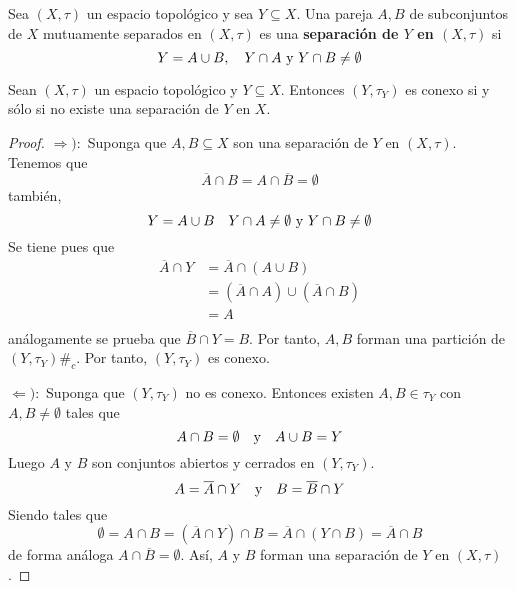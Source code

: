 \documentclass[12pt]{report}
\theoremstyle{largebreak}
\newcommand\contradiction{\ensuremath{\#_c}}
\newcommand{\Cls}[1]{\ensuremath{\overline{#1}}}
\begin{document}
    \begin{mydef}
        Sea $(X,\tau)$ un espacio topológico y sea $Y\subseteq X$. Una pareja $A,B$ de subconjuntos de $X$ mutuamente separados en $(X,\tau)$ es una \textbf{separación de $Y$ en $(X,\tau)$} si
        \begin{equation*}
            Y=A\cup B,\quad Y\cap A\textup{ y }Y\cap B \neq\emptyset
        \end{equation*}
    \end{mydef}

    \begin{propo}
        Sean $(X,\tau)$ un espacio topológico y $Y\subseteq X$. Entonces $(Y,\tau_Y)$ es conexo si y sólo si no existe una separación de $Y$ en $X$.
    \end{propo}

    \begin{proof}
        $\Rightarrow):$ Suponga que $A,B\subseteq X$ son una separación de $Y$ en $(X,\tau)$. Tenemos que
        \begin{equation*}
            \Cls{A}\cap B=A\cap\Cls{B}=\emptyset
        \end{equation*}
        también,
        \begin{equation*}
            Y=A\cup B\quad Y\cap A\neq\emptyset\textup{ y }Y\cap B\neq\emptyset
        \end{equation*}
        Se tiene pues que
        \begin{equation*}
            \begin{split}
                \Cls{A}\cap Y &=\Cls{A}\cap (A\cup B)\\
                &=(\Cls{A}\cap A)\cup (\Cls{A}\cap B)\\
                &=A\\
            \end{split}
        \end{equation*}
        análogamente se prueba que $\Cls{B}\cap Y=B$. Por tanto, $A,B$ forman una partición de $(Y,\tau_Y)$\contradiction. Por tanto, $(Y,\tau_Y)$ es conexo.

        $\Leftarrow):$ Suponga que $(Y,\tau_Y)$ no es conexo. Entonces existen $A,B\in\tau_Y$ con $A,B\neq\emptyset$ tales que
        \begin{equation*}
            A\cap B=\emptyset\quad\textup{y}\quad A\cup B=Y
        \end{equation*}
        Luego $A$ y $B$ son conjuntos abiertos y cerrados en $(Y,\tau_Y)$.
        \begin{equation*}
            A=\Cls{A}\cap Y\quad\textup{y}\quad B=\Cls{B}\cap Y
        \end{equation*}
        Siendo tales que
        \begin{equation*}
            \emptyset=A\cap B=(\Cls{A}\cap Y)\cap B=\Cls{A}\cap(Y\cap B)=\Cls{A}\cap B
        \end{equation*}
        de forma análoga $A\cap\Cls{B}=\emptyset$. Así, $A$ y $B$ forman una separación de $Y$ en $(X,\tau)$.
    \end{proof}
\end{document}
